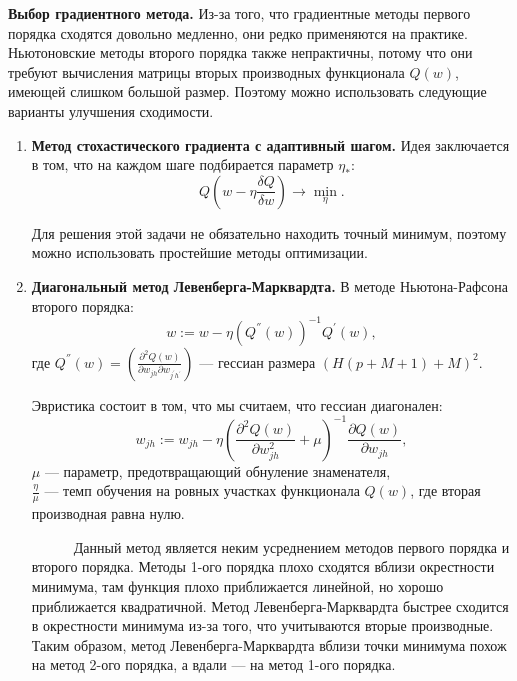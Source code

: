 \documentclass[specialist, 12pt, 
subf, %
href, colorlinks=true,
substylefile = spbu.rtx,
]{disser}
\begin{document}
\textbf{Выбор градиентного метода.} Из-за того, что градиентные методы первого порядка сходятся довольно медленно, они редко применяются на практике. Ньютоновские методы второго порядка также непрактичны, потому что они требуют вычисления матрицы вторых производных функционала $Q(w)$, имеющей слишком большой размер. Поэтому можно использовать следующие варианты улучшения сходимости.
\begin{enumerate}
	\item \textbf{Метод стохастического градиента с адаптивный шагом.} Идея заключается в том, что на каждом шаге подбирается параметр $\eta_{*}$:
	\begin{equation*}
		Q(w - \eta \frac{\delta Q}{\delta w}) \rightarrow \min_\eta.
	\end{equation*}
	
	Для решения этой задачи не обязательно находить точный минимум, поэтому можно использовать простейшие методы оптимизации.
	\item \textbf{Диагональный метод Левенберга-Марквардта.}
		В методе Ньютона-Рафсона второго порядка:
	\begin{equation*}
	w := w - \eta (Q^{''}(w))^{-1} Q^{'}(w),
	\end{equation*}
	где $Q^{''}(w) = \left( \frac{\partial^2 Q(w) }{\partial w_{jh} \partial w_{j^{'}h^{'}}}   \right)$ --- гессиан размера $(H(p+M+1) + M)^2$.
	
	Эвристика состоит в том, что мы считаем, что гессиан диагонален:
	\begin{equation*}
	w_{jh} := w_{jh} - \eta \left(  \frac{\partial^2 Q(w) }{\partial w_{jh}^2} + \mu  \right) ^{-1} \frac{\partial Q(w) }{\partial w_{jh}}, 
	\end{equation*} 
	$\mu$ --- параметр, предотвращающий обнуление знаменателя, \\
	$\frac{\eta}{\mu}$ --- темп обучения на ровных участках функционала $Q(w)$, где вторая производная равна нулю.
	
	~~~~~~Данный метод является неким усреднением методов первого порядка и второго порядка. Методы 1-ого порядка плохо сходятся вблизи окрестности минимума, там функция плохо приближается линейной, но хорошо приближается квадратичной. Метод Левенберга-Марквардта быстрее сходится в окрестности минимума из-за того, что учитываются вторые производные. Таким образом, метод Левенберга-Марквардта вблизи точки минимума похож на метод 2-ого порядка, а вдали --- на метод 1-ого порядка.
\end{enumerate}
\end{document}
